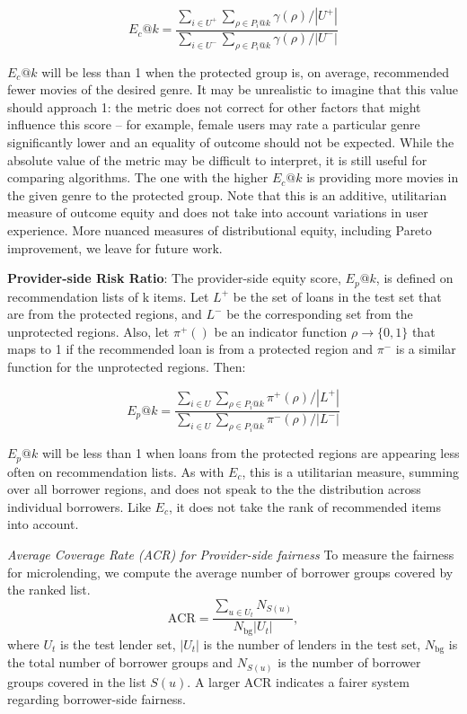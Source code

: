         \begin{equation}
        E_c@k=\frac{\sum_{i \in U^+}{\sum_{\rho \in P_i@k}{\gamma(\rho)}}/|U^+|}
        {\sum_{i \in U^-}{\sum_{\rho \in P_i@k}{\gamma(\rho)}}/|U^-|}
        \end{equation}
        
        $E_c@k$ will be less than 1 when the protected group is, on average, recommended fewer movies of the desired genre. It may be unrealistic to imagine that this value should approach 1: the metric does not correct for other factors that might influence this score -- for example, female users may rate a particular genre significantly lower and an equality of outcome should not be expected. While the absolute value of the metric may be difficult to interpret, it is still useful for comparing algorithms. The one with the higher $E_c@k$ is providing more movies in the given genre to the protected group. Note that this is an additive, utilitarian measure of outcome equity and does not take into account variations in user experience. More nuanced measures of distributional equity, including Pareto improvement, we leave for future work.
        
        
        \textbf{Provider-side Risk Ratio}: The provider-side equity score, $E_p@k$, is defined on recommendation lists of k items. Let $L^+$ be the set of loans in the test set that are from the protected regions, and $L^-$ be the corresponding set from the unprotected regions. Also, let $\pi^+()$ be an indicator function $\rho \rightarrow \{0,1\}$ that maps to 1 if the recommended loan is from a protected region and $\pi^-$ is a similar function for the unprotected regions. Then:

        \begin{equation}
        E_p@k=\frac{\sum_{i \in U}{\sum_{\rho \in P_i@k}{\pi^+(\rho)}}/|L^+|}
        {\sum_{i \in U}{\sum_{\rho \in P_i@k}{\pi^-(\rho)}}/|L^-|}
        \end{equation}
        
        $E_p@k$ will be less than 1 when loans from the protected regions are appearing less often on recommendation lists. As with $E_c$, this is a utilitarian measure, summing over all borrower regions, and does not speak to the the distribution across individual borrowers. Like $E_c$, it does not take the rank of recommended items into account.


        \textit{Average Coverage Rate (ACR) for Provider-side fairness}
        To measure the fairness for microlending, we compute the average number of borrower groups covered by the ranked list.
        \begin{equation}
            \text{ACR}=\frac{\sum_{u\in U_t}N_{S(u)}}{N_\text{bg}|U_t|},
        \end{equation}
        where $U_t$ is the test lender set, $|U_t|$ is the number of lenders in the test set, $N_\text{bg}$ is the total number of borrower groups and $N_{S(u)}$ is the number of borrower groups covered in the list $S(u)$. A larger ACR indicates a fairer system regarding borrower-side fairness.
        
